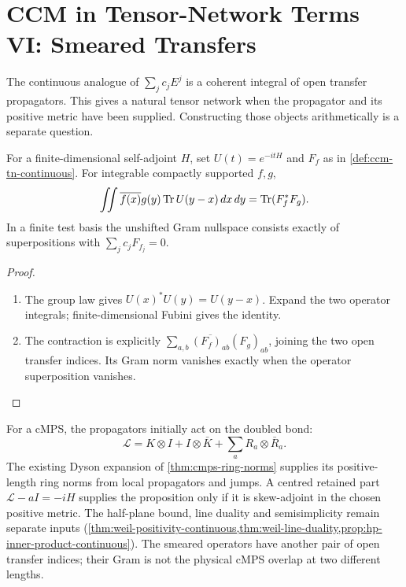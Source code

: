 
\section{CCM in Tensor-Network Terms VI: Smeared Transfers}
\label{sec:ccm-tn-continuous}

The continuous analogue of $\sum_jc_jE^j$ is a coherent integral of
open transfer propagators. This gives a natural tensor network when
the propagator and its positive metric have been supplied. Constructing
those objects arithmetically is a separate question.

\begin{proposition}
\label{prop:ccm-tn-continuous-smeared-gram}
For a finite-dimensional self-adjoint $H$, set $U(t)=e^{-itH}$ and
$F_f$ as in \cref{def:ccm-tn-continuous}. For integrable compactly
supported $f,g$,
\[
 \iint\overline{f(x)}g(y)\operatorname{Tr} U(y-x)\,dx\,dy
       =\operatorname{Tr}(F_f^*F_g).
\]
In a finite test basis the unshifted Gram nullspace consists exactly
of superpositions with $\sum_jc_jF_{f_j}=0$.
\end{proposition}
\begin{proof}
\begin{enumerate}
\item[$\langle1\rangle$1.] The group law gives $U(x)^*U(y)=U(y-x)$.
Expand the two operator integrals; finite-dimensional Fubini gives
the identity.
\item[$\langle1\rangle$2.] The contraction is explicitly
$\sum_{a,b}\overline{(F_f)_{ab}}(F_g)_{ab}$, joining the two open
transfer indices. Its Gram norm vanishes exactly when the operator
superposition vanishes.
\end{enumerate}
\end{proof}

For a cMPS, the propagators initially act on the doubled bond:
\[
 \mathcal L=K\otimes I+I\otimes\bar K+\sum_a R_a\otimes\bar R_a.
\]
The existing Dyson expansion of \cref{thm:cmps-ring-norms} supplies
its positive-length ring norms from local propagators and jumps.
A centred retained part $\mathcal L-aI=-iH$ supplies the proposition
only if it is skew-adjoint in the chosen positive metric. The
half-plane bound, line duality and semisimplicity remain separate
inputs (\cref{thm:weil-positivity-continuous,thm:weil-line-duality,prop:hp-inner-product-continuous}).
The smeared operators have another pair of open transfer indices;
their Gram is not the physical cMPS overlap at two different lengths.


